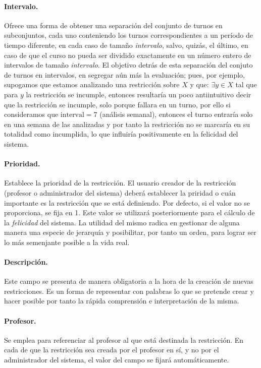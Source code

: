 \paragraph{Intervalo.}
Ofrece una forma de obtener una separación del  conjunto de turnos en subconjuntos, cada uno conteniendo los turnos correspondientes a un período de tiempo diferente, en cada caso de tamaño \textit{intervalo}, salvo, quizás, el último, en caso de que el curso no pueda ser dividido exactamente en un número 
entero de intervalos de tamaño \textit{intervalo}. El objetivo detrás de esta separación del conjuto de turnos en intervalos, en segregar aún más la evaluación; pues, por ejemplo, supogamos que estamos analizando una restricción sobre $X$ y que: $\exists y \in X $ tal que para $y$ la restricción se incumple, entonces resultaría un poco antiintuitivo decir que la restricción se incumple, solo porque fallara en un turno, por ello si consideramos que $\text{interval} = 7$ (análisis semanal), entonces el turno entraría solo en una semana de las analizadas y por tanto la restricción no se marcaría en su totalidad como incumplida, lo que influiría positivamente en la felicidad del sistema.

\paragraph{Prioridad.}
\label{def:priority}
Establece la prioridad de la restricción. El usuario creador de la restricción (profesor o administrador del sistema) deberá establecer la priridad o cuán importante es la restricción que se está definiendo. Por defecto, si el valor no se proporciona, se fija en 1. Este valor se utilizará posteriormente para el cálculo de la \textit{felicidad} del sistema. La utilidad del mismo radica en gestionar de alguna manera una especie de jerarquía y posibilitar, por tanto un orden, para lograr ser lo más semenjante posible a la vida real.

\paragraph{Descripción.}
Este campo se presenta de manera obligatoria a la hora de la creación de nuevas restricciones. Es un forma de representar con palabras lo que se pretende crear y hacer posible por tanto la rápida comprensión e interpretación de la misma. 

\paragraph{Profesor.}
Se emplea para referenciar al profesor al que está destinada la restricción. En cada de que la restricción sea creada por el profesor en sí, y no por el administrador del sistema, el valor del campo se fijará automáticamente. \\\\

